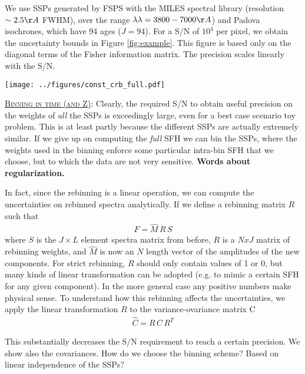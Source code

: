 \documentclass{article}
\begin{document}
We use SSPs generated by FSPS with 
the MILES spectral library (resolution $\sim 2.5\AA$ FWHM), over the range $\lambda\lambda = 3800-7000\AA$) and 
Padova isochrones, which have 94 ages ($J=94$).
For a S/N of $10^4$ per pixel, we obtain the uncertainty bounds in Figure \ref{fig:example}.
This figure is based only on the diagonal terms of the Fisher information matrix.
The precision scales linearly with the S/N.

\begin{figure*}[h!]
\texttt{[image: ../figures/const\_crb\_full.pdf]}
\caption{Top: Input masses and Cramer-Rao bound for a constant SFH, single metallicity, and S/N$= 10^4$, when including all 94 isochrone ages.  Bottom: Ratio of the input mass to the Cramer-Rao bound. 
\label{fig:example}}
\end{figure*}



\underline{\textsc{Binning in time (and Z)}}:
Clearly, the required S/N to obtain useful precision on the weights of \emph{all} the SSPs is exceedingly large, even for a best case scenario toy problem.  
This is at least partly because the different SSPs are actually extremely similar.  
If we give up on computing the \emph{full} SFH we can bin the SSPs, 
where the weights used in the binning enforce some particular intra-bin SFH that we choose, but to which the data are not very sensitive.
{\bf Words about regularization.}


In fact, since the rebinning is a linear operation, we can compute the uncertainties on rebinned spectra analytically.
If we define a rebinning matrix $R$ such that
\begin{eqnarray}
F = \hat{M} \, R \, S
\end{eqnarray}
where $S$ is the $J \times L$ element spectra matrix from before, $R$ is a $N x J$ matrix of rebinning weights, and $\hat{M}$ is now an $N$ length vector of the amplitudes of the new components.  
For strict rebinning, $R$ should only contain values of 1 or 0, 
but many kinds of linear transformation can be adopted (e.g. to mimic a certain SFH for any given component).
In the more general case any positive numbers make physical sense.
To understand how this rebinning affects the uncertainties, 
we apply the linear transformation $R$ to the variance-ovariance matrix C
\begin{eqnarray}
\hat{C} = R \, C  \, R^T
\end{eqnarray}

This substantially decreases the S/N requirement to reach a certain precision.  
We show also the covariances.
How do we choose the binning scheme?  
Based on linear independence of the SSPs?
\end{document}

